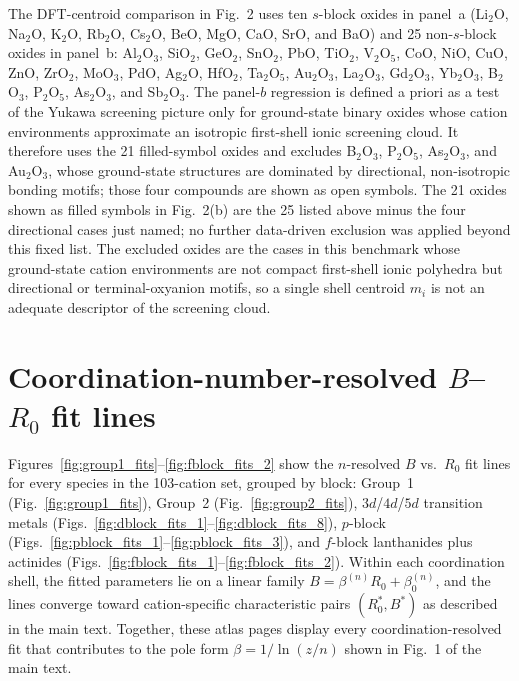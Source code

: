 \documentclass[aps,prl,twocolumn,10pt,superscriptaddress,floatfix]{revtex4-2}
\providecommand{\texorpdfstring}[2]{#1}
\begin{document}
The DFT-centroid comparison in Fig.~2 uses ten $s$-block oxides in
panel~a (Li$_2$O, Na$_2$O, K$_2$O, Rb$_2$O, Cs$_2$O, BeO, MgO, CaO,
SrO, and BaO) and 25 non-$s$-block oxides in panel~b: Al$_2$O$_3$,
SiO$_2$, GeO$_2$, SnO$_2$, PbO, TiO$_2$, V$_2$O$_5$, CoO, NiO, CuO,
ZnO, ZrO$_2$, MoO$_3$, PdO, Ag$_2$O, HfO$_2$, Ta$_2$O$_5$, Au$_2$O$_3$,
La$_2$O$_3$, Gd$_2$O$_3$, Yb$_2$O$_3$, B$_2$O$_3$, P$_2$O$_5$,
As$_2$O$_3$, and Sb$_2$O$_3$.  The panel-$b$ regression is defined
a priori as a test of the Yukawa screening picture only for
ground-state binary oxides whose cation environments approximate an
isotropic first-shell ionic screening cloud.  It therefore uses the 21
filled-symbol oxides and excludes B$_2$O$_3$, P$_2$O$_5$,
As$_2$O$_3$, and Au$_2$O$_3$, whose ground-state structures are dominated by
directional, non-isotropic bonding motifs; those four compounds are shown
as open symbols.  The 21 oxides shown as filled symbols in Fig.~2(b)
are the 25 listed above minus the four directional cases just named;
no further data-driven exclusion was applied beyond this fixed list.  The excluded oxides are the cases in this benchmark whose
ground-state cation environments are not compact first-shell ionic
polyhedra but directional or terminal-oxyanion motifs, so a single
shell centroid $m_i$ is not an adequate descriptor of the screening
cloud.

\section{\texorpdfstring{Coordination-number-resolved $B$--$R_0$ fit lines}{Coordination-number-resolved B-R0 fit lines}}

Figures~\ref{fig:group1_fits}--\ref{fig:fblock_fits_2} show the
$n$-resolved $B$ vs.\ $R_0$ fit lines for every species in the
103-cation set, grouped by block: Group~1 (Fig.~\ref{fig:group1_fits}),
Group~2 (Fig.~\ref{fig:group2_fits}), $3d$/$4d$/$5d$ transition metals
(Figs.~\ref{fig:dblock_fits_1}--\ref{fig:dblock_fits_8}), $p$-block
(Figs.~\ref{fig:pblock_fits_1}--\ref{fig:pblock_fits_3}), and $f$-block
lanthanides plus actinides
(Figs.~\ref{fig:fblock_fits_1}--\ref{fig:fblock_fits_2}).  Within each
coordination shell, the fitted parameters lie on a linear family
$B=\beta^{(n)}R_0+\beta_0^{(n)}$, and the lines converge toward
cation-specific characteristic pairs $(R_0^*,B^*)$ as described in the
main text.  Together, these atlas pages display every coordination-resolved
fit that contributes to the pole form $\beta=1/\ln(z/n)$ shown in
Fig.~1 of the main text.
\end{document}
